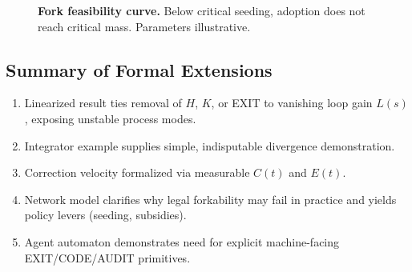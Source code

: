\begin{figure}[htbp]
\centering
{}
\caption{\textbf{Fork feasibility curve.} Below critical seeding, adoption does not reach critical mass. Parameters illustrative.}
\label{fig:fork-feasibility}
\end{figure}

\subsection{Summary of Formal Extensions}

\begin{enumerate}
    \item Linearized result ties removal of $H$, $K$, or EXIT to vanishing loop gain $L(s)$, exposing unstable process modes.
    \item Integrator example supplies simple, indisputable divergence demonstration.
    \item Correction velocity formalized via measurable $C(t)$ and $E(t)$.
    \item Network model clarifies why legal forkability may fail in practice and yields policy levers (seeding, subsidies).
    \item Agent automaton demonstrates need for explicit machine-facing EXIT/CODE/AUDIT primitives.
\end{enumerate}